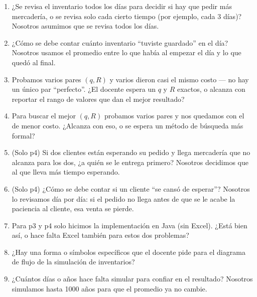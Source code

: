 \documentclass[12pt]{article}
\begin{document}
\begin{enumerate}
    \item ¿Se revisa el inventario todos los días para decidir si hay que pedir más mercadería, o se revisa solo cada cierto tiempo (por ejemplo, cada 3 días)? Nosotros asumimos que se revisa todos los días.

    \item ¿Cómo se debe contar cuánto inventario ``tuviste guardado'' en el día? Nosotros usamos el promedio entre lo que había al empezar el día y lo que quedó al final.

    \item Probamos varios pares $(q,R)$ y varios dieron casi el mismo costo — no hay un único par ``perfecto''. ¿El docente espera un $q$ y $R$ exactos, o alcanza con reportar el rango de valores que dan el mejor resultado?

    \item Para buscar el mejor $(q,R)$ probamos varios pares y nos quedamos con el de menor costo. ¿Alcanza con eso, o se espera un método de búsqueda más formal?

    \item (Solo p4) Si dos clientes están esperando su pedido y llega mercadería que no alcanza para los dos, ¿a quién se le entrega primero? Nosotros decidimos que al que lleva más tiempo esperando.

    \item (Solo p4) ¿Cómo se debe contar si un cliente ``se cansó de esperar''? Nosotros lo revisamos día por día: si el pedido no llega antes de que se le acabe la paciencia al cliente, esa venta se pierde.

    \item Para p3 y p4 solo hicimos la implementación en Java (sin Excel). ¿Está bien así, o hace falta Excel también para estos dos problemas?

    \item ¿Hay una forma o símbolos específicos que el docente pide para el diagrama de flujo de la simulación de inventarios?

    \item ¿Cuántos días o años hace falta simular para confiar en el resultado? Nosotros simulamos hasta 1000 años para que el promedio ya no cambie.
\end{enumerate}
\end{document}
